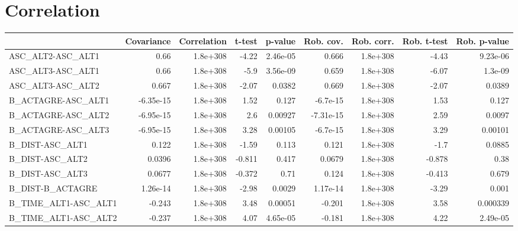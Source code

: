 \section{Correlation}
\begin{tabular}{lrrrrrrrr}
\toprule
{} &  Covariance &  Correlation &    t-test &  p-value &  Rob. cov. &  Rob. corr. &  Rob. t-test &  Rob. p-value \\
\midrule
ASC\_ALT2-ASC\_ALT1                 &        0.66 &     1.8e+308 &     -4.22 & 2.46e-05 &      0.666 &    1.8e+308 &        -4.43 &      9.23e-06 \\
ASC\_ALT3-ASC\_ALT1                 &        0.66 &     1.8e+308 &      -5.9 & 3.56e-09 &      0.659 &    1.8e+308 &        -6.07 &       1.3e-09 \\
ASC\_ALT3-ASC\_ALT2                 &       0.667 &     1.8e+308 &     -2.07 &   0.0382 &      0.669 &    1.8e+308 &        -2.07 &        0.0389 \\
B\_ACTAGRE-ASC\_ALT1                &   -6.35e-15 &     1.8e+308 &      1.52 &    0.127 &   -6.7e-15 &    1.8e+308 &         1.53 &         0.127 \\
B\_ACTAGRE-ASC\_ALT2                &   -6.95e-15 &     1.8e+308 &       2.6 &  0.00927 &  -7.31e-15 &    1.8e+308 &         2.59 &        0.0097 \\
B\_ACTAGRE-ASC\_ALT3                &   -6.95e-15 &     1.8e+308 &      3.28 &  0.00105 &   -6.7e-15 &    1.8e+308 &         3.29 &       0.00101 \\
B\_DIST-ASC\_ALT1                   &       0.122 &     1.8e+308 &     -1.59 &    0.113 &      0.121 &    1.8e+308 &         -1.7 &        0.0885 \\
B\_DIST-ASC\_ALT2                   &      0.0396 &     1.8e+308 &    -0.811 &    0.417 &     0.0679 &    1.8e+308 &       -0.878 &          0.38 \\
B\_DIST-ASC\_ALT3                   &      0.0677 &     1.8e+308 &    -0.372 &     0.71 &      0.124 &    1.8e+308 &       -0.413 &         0.679 \\
B\_DIST-B\_ACTAGRE                  &    1.26e-14 &     1.8e+308 &     -2.98 &   0.0029 &   1.17e-14 &    1.8e+308 &        -3.29 &         0.001 \\
B\_TIME\_ALT1-ASC\_ALT1              &      -0.243 &     1.8e+308 &      3.48 &  0.00051 &     -0.201 &    1.8e+308 &         3.58 &      0.000339 \\
B\_TIME\_ALT1-ASC\_ALT2              &      -0.237 &     1.8e+308 &      4.07 & 4.65e-05 &     -0.181 &    1.8e+308 &         4.22 &      2.49e-05 \\

\end{tabular}
